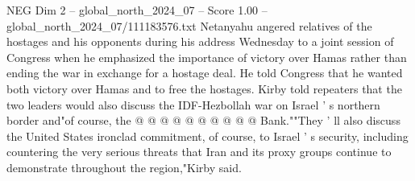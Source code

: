 \begin{textsample}{NEG Dim 2 – global\_north\_2024\_07 – Score 1.00 – global\_north\_2024\_07/111183576.txt}
Netanyahu angered relatives of the hostages and his opponents during his address Wednesday to a joint session of Congress when he emphasized the importance of victory over Hamas rather than ending the war in exchange for a hostage deal.
He told Congress that he wanted both victory over Hamas and to free the hostages.
Kirby told repeaters that the two leaders would also discuss the IDF-Hezbollah war on Israel ' s northern border and"of course, the @ @ @ @ @ @ @ @ @ @ Bank.""They ' ll also discuss the United States ironclad commitment, of course, to Israel ' s security, including countering the very serious threats that Iran and its proxy groups continue to demonstrate throughout the region,"Kirby said.

\end{textsample}
